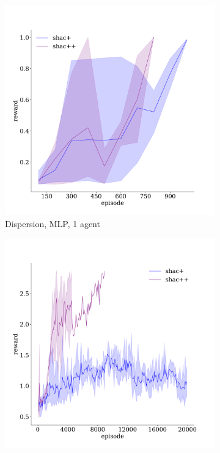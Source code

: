\begin{figure}[!t]
    \centering
    \begin{subfigure}[b]{0.32\textwidth}
        \includegraphics[width=\textwidth]{figs/dispersion-ablation-1-mlp.pdf}
        \caption{Dispersion, MLP, 1 agent}
        \label{fig:dispersion-ablation-mlp-1}
    \end{subfigure}
    \begin{subfigure}[b]{0.32\textwidth}
        \includegraphics[width=\textwidth]{figs/dispersion-ablation-3-mlp.pdf}

\end{subfigure}
\end{figure}
